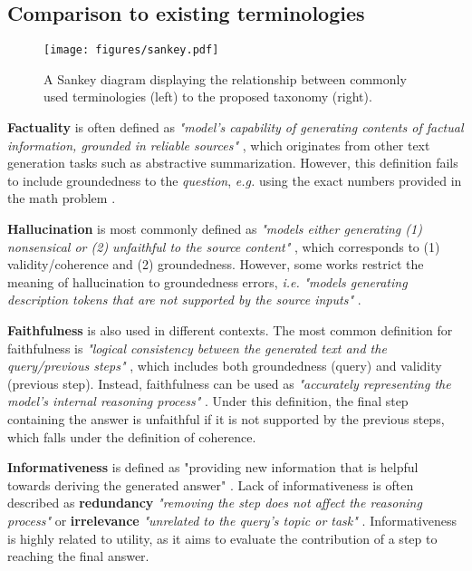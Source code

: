 \subsection{Comparison to existing terminologies}

\begin{figure}[tb]
    \centering
    \texttt{[image: figures/sankey.pdf]}
    \caption{A Sankey diagram displaying the relationship between commonly used terminologies (left) to the proposed taxonomy (right).}
    \label{fig:sankey}
\end{figure}

\textbf{Factuality} is often defined as \textit{"model’s capability of generating contents of factual information, grounded in reliable sources"} \citep{wang2023surveyfactualitylargelanguage, wang-etal-2024-factuality}, which originates from other text generation tasks such as abstractive summarization. However, this definition fails to include groundedness to the \textit{question}, \textit{e.g.} using the exact numbers provided in the math problem \citep{zhu2024deductivebeamsearchdecoding}.

\textbf{Hallucination} is most commonly defined as \textit{"models either generating (1) nonsensical or (2) unfaithful to the source content"} \citep{ji2023survey, banerjee2024llmshallucinateneedlive, huang2024survey}, which corresponds to (1) validity/coherence and (2) groundedness. However, some works restrict the meaning of hallucination to groundedness errors, \textit{i.e.} \textit{"models generating description tokens that are not supported by the source inputs"} \citep{xiao-wang-2021-hallucination, akbar-etal-2024-hallumeasure}.

\textbf{Faithfulness} is also used in different contexts. The most common definition for faithfulness is \textit{"logical consistency between the generated text and the query/previous steps"} \citep{maynez2020faithfulnessfactualityabstractivesummarization, creswell2022faithfulreasoningusinglarge, huang2024survey}, which includes both groundedness (query) and validity (previous step). Instead, faithfulness can be used as \textit{"accurately representing the model's internal reasoning process"} \citep{lyu-etal-2023-faithful, lanham2023measuringfaithfulnesschainofthoughtreasoning}. Under this definition, the final step containing the answer is unfaithful if it is not supported by the previous steps, which falls under the definition of coherence.

\textbf{Informativeness} is defined as "providing new information that is helpful towards deriving the generated answer" \citep{golovneva2023pathfinderguidedsearchmultistep, prasad-etal-2023-receval}. Lack of informativeness is often described as \textbf{redundancy} \textit{"removing the step does not affect the reasoning process"} \citep{chiang-lee-2024-reasoning, song2025prmbenchfinegrainedchallengingbenchmark, zhou2024languagemodelsperformrobust} or \textbf{irrelevance} \textit{"unrelated to the query's topic or task"} \citep{wang-etal-2023-towards, zhou2024languagemodelsperformrobust, jacovi-etal-2024-chain}. Informativeness is highly related to utility, as it aims to evaluate the contribution of a step to reaching the final answer.

